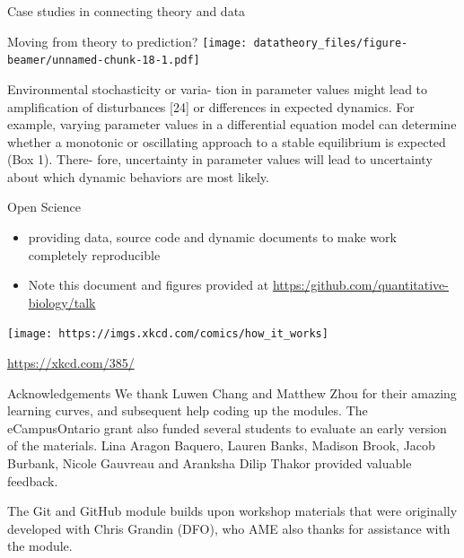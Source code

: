 \documentclass[
  ignorenonframetext,
]{beamer}
\providecommand{\tightlist}{%
  \setlength{\itemsep}{0pt}\setlength{\parskip}{0pt}}
\begin{document}
\begin{frame}{Case studies in connecting theory and data}
\protect\hypertarget{case-studies-in-connecting-theory-and-data}{}
\begin{block}{Moving from theory to prediction?}
\protect\hypertarget{moving-from-theory-to-prediction}{}
\texttt{[image: datatheory\_files/figure-beamer/unnamed-chunk-18-1.pdf]}
\end{block}

\begin{block}{}
\protect\hypertarget{section-1}{}
Environmental stochasticity or varia- tion in parameter values might
lead to amplification of disturbances {[}24{]} or differences in
expected dynamics. For example, varying parameter values in a
differential equation model can determine whether a monotonic or
oscillating approach to a stable equilibrium is expected (Box 1). There-
fore, uncertainty in parameter values will lead to uncertainty about
which dynamic behaviors are most likely.
\end{block}

\begin{block}{Open Science}
\protect\hypertarget{open-science}{}
\begin{itemize}
\tightlist
\item
  providing data, source code and dynamic documents to make work
  completely reproducible
\item
  Note this document and figures provided at
  \url{https:/github.com/quantitative-biology/talk}
\end{itemize}

\begin{center}\texttt{[image: https://imgs.xkcd.com/comics/how\_it\_works]} \end{center}

\url{https://xkcd.com/385/}
\end{block}

\begin{block}{Acknowledgements}
\protect\hypertarget{acknowledgements}{}
We thank Luwen Chang and Matthew Zhou for their amazing learning curves,
and subsequent help coding up the modules. The eCampusOntario grant also
funded several students to evaluate an early version of the materials.
Lina Aragon Baquero, Lauren Banks, Madison Brook, Jacob Burbank, Nicole
Gauvreau and Aranksha Dilip Thakor provided valuable feedback.

The Git and GitHub module builds upon workshop materials that were
originally developed with Chris Grandin (DFO), who AME also thanks for
assistance with the module.
\end{block}


\end{frame}
\end{document}
